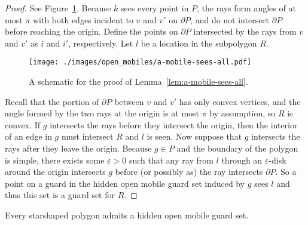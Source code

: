 \documentclass{cccg12}
\begin{document}
\begin{proof}
See Figure~\ref{fig:a-mobile-sees-all}.
Because $k$ sees every point in $P$, the rays form angles of at most $\pi$ with both edges incident to $v$ and $v'$ on $\partial P$, and do not intersect $\partial P$ before reaching the origin.
Define the points on $\partial P$ intersected by the rays from $v$ and $v'$ as $i$ and $i'$, respectively.
Let $l$ be a location in the subpolygon $R$.

\begin{figure}[ht]
\centering
\texttt{[image: ./images/open\_mobiles/a-mobile-sees-all.pdf]}
\caption{A schematic for the proof of Lemma~\ref{lem:a-mobile-sees-all}.}
\label{fig:a-mobile-sees-all}
\end{figure}

Recall that the portion of $\partial P$ between $v$ and $v'$ has only convex vertices, and the angle formed by the two rays at the origin is at most $\pi$ by assumption, so $R$ is convex.
If $g$ intersects the rays before they intersect the origin, then the interior of an edge in $g$ must intersect $R$ and $l$ is seen.
Now suppose that $g$ intersects the rays after they leave the origin.
Because $g \in P$ and the boundary of the polygon is simple, there exists some $\varepsilon > 0$ such that any ray from $l$ through an $\varepsilon$-disk around the origin intersects $g$ before (or possibly as) the ray intersects $\partial P$.
So a point on a guard in the hidden open mobile guard set induced by $g$ sees $l$ and thus this set is a guard set for $R$.
\end{proof}

\begin{lemma}
\label{lem:open-mobile-ss}
Every starshaped polygon admits a hidden open mobile guard set.
\end{lemma}
\end{document}
